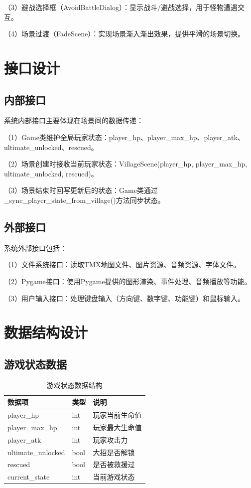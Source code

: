 \documentclass[a4paper,12pt]{article}
\begin{document}
（3）避战选择框（AvoidBattleDialog）：显示战斗/避战选择，用于怪物遭遇交互。

（4）场景过渡（FadeScene）：实现场景渐入渐出效果，提供平滑的场景切换。

\section{接口设计}

\subsection{内部接口}
系统内部接口主要体现在场景间的数据传递：

（1）Game类维护全局玩家状态：player\_hp、player\_max\_hp、player\_atk、ultimate\_unlocked、rescued。

（2）场景创建时接收当前玩家状态：VillageScene(player\_hp, player\_max\_hp, ultimate\_unlocked, rescued)。

（3）场景结束时回写更新后的状态：Game类通过\_sync\_player\_state\_from\_village()方法同步状态。

\subsection{外部接口}
系统外部接口包括：

（1）文件系统接口：读取TMX地图文件、图片资源、音频资源、字体文件。

（2）Pygame接口：使用Pygame提供的图形渲染、事件处理、音频播放等功能。

（3）用户输入接口：处理键盘输入（方向键、数字键、功能键）和鼠标输入。

\section{数据结构设计}

\subsection{游戏状态数据}
\begin{table}[h]
\centering
\caption{游戏状态数据结构}
\begin{tabular}{lll}
\toprule
数据项 & 类型 & 说明 \\
\midrule
player\_hp & int & 玩家当前生命值 \\
player\_max\_hp & int & 玩家最大生命值 \\
player\_atk & int & 玩家攻击力 \\
ultimate\_unlocked & bool & 大招是否解锁 \\
rescued & bool & 是否被救援过 \\
current\_state & int & 当前游戏状态 \\
\bottomrule
\end{tabular}
\end{table}
\end{document}

